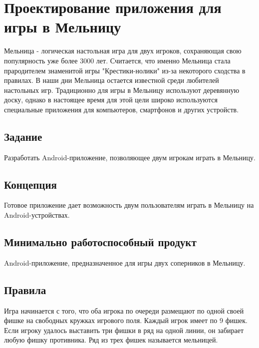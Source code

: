 \documentclass[a4paper]{article}
\begin{document}
\vfill %








\tableofcontents
\newpage



\section{Проектирование приложения для игры в Мельницу}

Мельница - логическая настольная игра для двух игроков, сохраняющая свою популярность уже более 3000 лет. Считается, что именно Мельница стала прародителем знаменитой игры "Крестики-нолики" из-за некоторого сходства в правилах. В наши дни Мельница остается известной среди любителей настольных игр. Традиционно для игры в Мельницу используют деревянную доску, однако в настоящее время для этой цели широко используются специальные приложения для компьютеров, смартфонов и других устройств.

\subsection{Задание}

Разработать Android-приложение, позволяющее двум игрокам играть в Мельницу.

\subsection{Концепция}

Готовое приложение дает возможность двум пользователям играть в Мельницу на Android-устройствах.

\subsection{Минимально работоспособный продукт}

Android-приложение, предназначенное для игры двух соперников в Мельницу.

\subsection{Правила}

Игра начинается с того, что оба игрока по очереди размещают по одной своей фишке на свободных кружках игрового поля. Каждый игрок имеет по 9 фишек. Если игроку удалось выставить три фишки в ряд на одной линии, он забирает любую фишку противника. Ряд из трех фишек называется мельницей.
\end{document}
